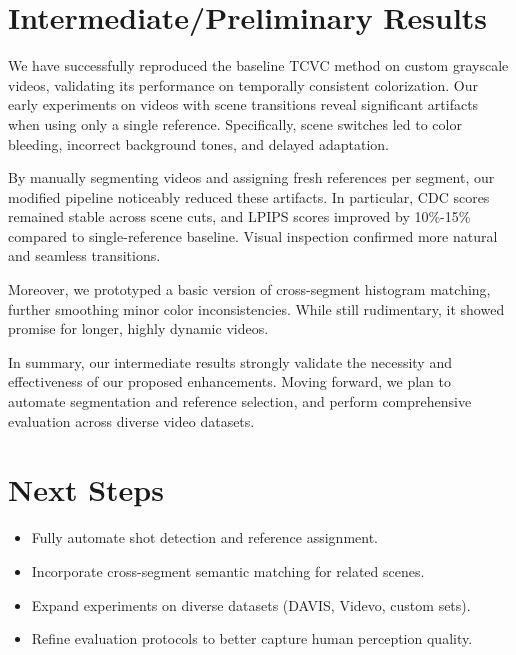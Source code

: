 \documentclass[10pt,twocolumn,letterpaper]{article}
\begin{document}
\section{Intermediate/Preliminary Results}
We have successfully reproduced the baseline TCVC method on custom grayscale videos, validating its performance on temporally consistent colorization. Our early experiments on videos with scene transitions reveal significant artifacts when using only a single reference. Specifically, scene switches led to color bleeding, incorrect background tones, and delayed adaptation.

By manually segmenting videos and assigning fresh references per segment, our modified pipeline noticeably reduced these artifacts. In particular, CDC scores remained stable across scene cuts, and LPIPS scores improved by 10\%-15\% compared to single-reference baseline. Visual inspection confirmed more natural and seamless transitions.

Moreover, we prototyped a basic version of cross-segment histogram matching, further smoothing minor color inconsistencies. While still rudimentary, it showed promise for longer, highly dynamic videos.

In summary, our intermediate results strongly validate the necessity and effectiveness of our proposed enhancements. Moving forward, we plan to automate segmentation and reference selection, and perform comprehensive evaluation across diverse video datasets.

\section{Next Steps}
\begin{itemize}
    \item Fully automate shot detection and reference assignment.
    \item Incorporate cross-segment semantic matching for related scenes.
    \item Expand experiments on diverse datasets (DAVIS, Videvo, custom sets).
    \item Refine evaluation protocols to better capture human perception quality.
\end{itemize}
\end{document}
